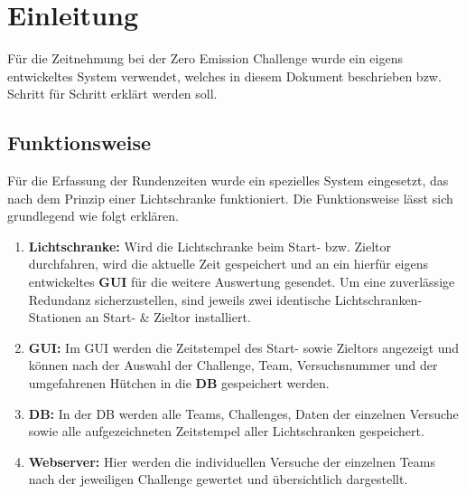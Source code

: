 \section{Einleitung}
Für die Zeitnehmung bei der Zero Emission Challenge wurde ein eigens entwickeltes System verwendet, welches in diesem Dokument beschrieben bzw. Schritt für Schritt erklärt werden soll.

\subsection{Funktionsweise}
Für die Erfassung der Rundenzeiten wurde ein spezielles System eingesetzt, das nach dem Prinzip einer Lichtschranke funktioniert. Die Funktionsweise lässt sich grundlegend wie folgt erklären.

\begin{enumerate}
	\item \textbf{Lichtschranke:} Wird die Lichtschranke beim Start- bzw. Zieltor durchfahren, wird die aktuelle Zeit gespeichert und an ein hierfür eigens entwickeltes \textbf{\ac{GUI}} für die weitere Auswertung gesendet. Um eine zuverlässige Redundanz sicherzustellen, sind jeweils zwei identische Lichtschranken-Stationen an  Start- \& Zieltor installiert.
	
	\item \textbf{\acl{GUI}:} Im \ac{GUI} werden die Zeitstempel des Start- sowie Zieltors angezeigt und können nach der Auswahl der Challenge, Team, Versuchsnummer und der umgefahrenen Hütchen in die \textbf{\ac{DB}} gespeichert werden.
	
	\item \textbf{\acl{DB}:} In der \ac{DB} werden alle Teams, Challenges, Daten der einzelnen Versuche sowie alle aufgezeichneten Zeitstempel aller Lichtschranken gespeichert.
	
	\item \textbf{Webserver:} Hier werden die individuellen Versuche der einzelnen Teams nach der jeweiligen Challenge gewertet und übersichtlich dargestellt.
\end{enumerate}






